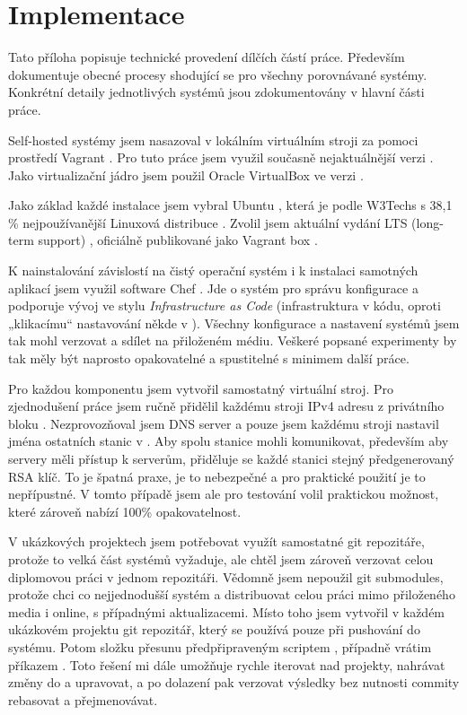 \chapter{Implementace}\label{ch:implementace}

Tato příloha popisuje technické provedení dílčích částí práce. Především dokumentuje obecné procesy shodující se pro všechny porovnávané \CICD systémy. Konkrétní detaily jednotlivých systémů jsou zdokumentovány v hlavní části práce.

Self-hosted \CICD systémy jsem nasazoval v lokálním virtuálním stroji za pomoci prostředí Vagrant \cite{hashimoto-vagrant}\cite{susanka-vagrant}. Pro tuto práce jsem využil současně nejaktuálnější verzi . Jako virtualizační jádro jsem použil Oracle VirtualBox \cite{virtualbox} ve verzi .

Jako základ každé instalace jsem vybral Ubuntu \cite{ubuntu}, která je podle W3Techs s 38,1 \% nejpoužívanější Linuxová distribuce \cite{w3techs-stats}. Zvolil jsem aktuální vydání LTS (long-term support) , oficiálně publikované jako Vagrant box .

K nainstalování závislostí na čistý operační systém i k instalaci samotných aplikací jsem využil software Chef \cite{chef}. Jde o systém pro správu konfigurace a podporuje vývoj ve stylu \textit{Infrastructure as Code} (infrastruktura v kódu, oproti „klikacímu“ nastavování někde v ). Všechny konfigurace a nastavení systémů jsem tak mohl verzovat a sdílet na přiloženém médiu. Veškeré popsané experimenty by tak měly být naprosto opakovatelné a spustitelné s minimem další práce.

Pro každou komponentu jsem vytvořil samostatný virtuální stroj. Pro zjednodušení práce jsem ručně přidělil každému stroji IPv4 adresu z privátního bloku . Nezprovozňoval jsem DNS server a pouze jsem každému stroji nastavil jména ostatních stanic v . Aby spolu stanice mohli komunikovat, především aby \CD servery měli přístup k \HTTP serverům, přiděluje se každé stanici stejný předgenerovaný RSA klíč. To je špatná praxe, je to nebezpečné a pro praktické použití je to nepřípustné. V tomto případě jsem ale pro testování volil praktickou možnost, které zároveň nabízí 100\% opakovatelnost.

V ukázkových projektech jsem potřebovat využít samostatné git repozitáře, protože to velká část \CICD systémů vyžaduje, ale chtěl jsem zároveň verzovat celou diplomovou práci v jednom repozitáři. Vědomně jsem nepoužil git submodules, protože chci co nejjednodušší systém a distribuovat celou práci mimo přiloženého media i online, s případnými aktualizacemi. Místo toho jsem vytvořil v každém ukázkovém projektu git repozitář, který se používá pouze při pushování do \CICD systému. Potom složku  přesunu předpřipraveným scriptem , případně vrátim příkazem . Toto řešení mi dále umožňuje rychle iterovat nad projekty, nahrávat změny do \CICD a upravovat, a po dolazení pak verzovat výsledky bez nutnosti commity rebasovat a přejmenovávat.

